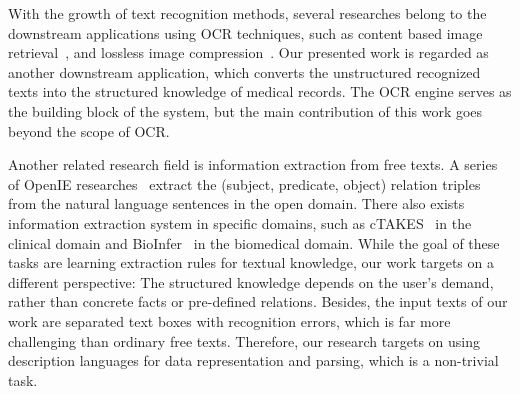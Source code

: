 With the growth of text recognition methods,
several researches belong to the downstream applications using OCR techniques,
such as content based image retrieval~\cite{wankhede2017different},
and lossless image compression~\cite{erguzen2017medical}.
Our presented work is regarded as another downstream application,
which converts the unstructured recognized texts into
the structured knowledge of medical records.
The OCR engine serves as the building block of the system,
but the main contribution of this work goes beyond the scope of OCR.


Another related research field is information extraction from free texts.
A series of OpenIE researches~\cite{carlson2010toward,fader2011identifying}
extract the (subject, predicate, object) relation triples from the
natural language sentences in the open domain.
There also exists information extraction system in specific domains,
such as cTAKES~\cite{savova2010mayo} in the clinical domain
and BioInfer~\cite{pyysalo2007bioinfer} in the biomedical domain.
While the goal of these tasks are learning extraction rules
for textual knowledge, our work targets on a different perspective:
The structured knowledge depends on the user's demand,
rather than concrete facts or pre-defined relations. Besides,
the input texts of our work are separated text boxes with recognition errors,
which is far more challenging than ordinary free texts.
Therefore, our research targets on using description languages for
data representation and parsing, which is a non-trivial task.


